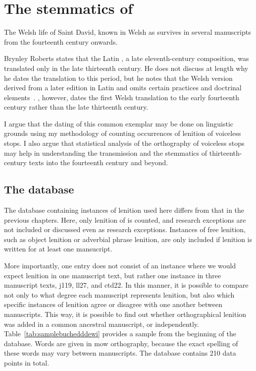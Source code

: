 \chapter{The stemmatics of }
\label{cha:stemm-mwbuch-dewi}
The Welsh life of Saint David, known in Welsh as  survives in several manuscripts from the fourteenth century onwards. 

Brynley Roberts states that the Latin , a late eleventh-century composition, was translated only in the late thirteenth century. He does not discuss at length why he dates the translation to this period, but he notes that the Welsh version derived from a later edition in Latin and omits certain practices and doctrinal elements~\autocite[218--219]{Rob_Ystoriaeu11}. \Textcite[liv]{Eva_Welsh88}, however, dates the first Welsh translation to the early fourteenth century rather than the late thirteenth century.

I argue that the dating of this common exemplar may be done on linguistic grounds using my methodology of counting occurrences of lenition of voiceless stops. I also argue that statistical analysis of the orthography of voiceless stops may help in understanding the transmission and the stemmatics of thirteenth-century texts into the fourteenth century and beyond.



\section{The database}
\label{sec:database}

The database containing instances of lenition used here differs from that in the previous chapters. Here, only lenition of  is counted, and research exceptions are not included or discussed even as research exceptions. Instances of free lenition, such as object lenition or adverbial phrase lenition, are only included if lenition is written for at least one mansucript.


More importantly, one entry does not consist of an instance where we would expect lenition in one manuscript text, but rather one instance in three manuscript texts, \gls{j119}, \gls{ll27}, and \gls{ctd22}. In this manner, it is possible to compare not only to what degree each manuscript represents lenition, but also which specific instances of lenition agree or disagree with one another between manuscripts. This way, it is possible to find out whether orthographical lenition was added in a common ancestral manuscript, or independently. Table~\ref{tab:samplebuchedddewi} provides a sample from the beginning of the database. Words are given in \gls{mow} orthography, because the exact spelling of these words may vary between manuscripts. The database contains 210 data points in total.

